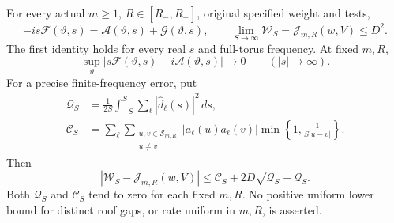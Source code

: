 \begin{theorem}
\label{thm:js-spectrum}
For every actual $m\ge1$, $R\in[R_-,R_+]$, original specified
weight and tests,
\begin{equation}\label{eq:js-identity}
 -is\mathcal F(\vartheta,s)
       =\mathcal A(\vartheta,s)+\mathcal G(\vartheta,s),
 \qquad
 \lim_{S\to\infty}\mathcal W_S
       =\mathcal J_{m,R}(w,V)\le D^2.
\end{equation}
The first identity holds for every real $s$ and full-torus
frequency. At fixed $m,R$,
\begin{equation}\label{eq:js-asymptotic}
 \sup_\vartheta
 |s\mathcal F(\vartheta,s)-i\mathcal A(\vartheta,s)|
       \longrightarrow0\qquad(|s|\to\infty).
\end{equation}
For a precise finite-frequency error, put
\begin{align}
 \mathcal Q_S&=\frac1{2S}\int_{-S}^S
                         \sum_\ell|\widehat d_\ell(s)|^2\,ds,
                                                   \label{eq:js-q}\\
 \mathcal C_S&=\sum_\ell
 \sum_{\substack{u,v\in\mathcal S_{m,R}\\u\ne v}}
 |a_\ell(u)a_\ell(v)|
       \min\left\{1,\frac1{S|u-v|}\right\}.
                                                   \label{eq:js-cross}
\end{align}
Then
\begin{equation}\label{eq:js-finite}
 |\mathcal W_S-\mathcal J_{m,R}(w,V)|
       \le\mathcal C_S+2D\sqrt{\mathcal Q_S}+\mathcal Q_S.
\end{equation}
Both $\mathcal Q_S$ and $\mathcal C_S$ tend to zero for each
fixed $m,R$. No positive uniform lower bound for distinct
roof gaps, or rate uniform in $m,R$, is asserted.
\end{theorem}
